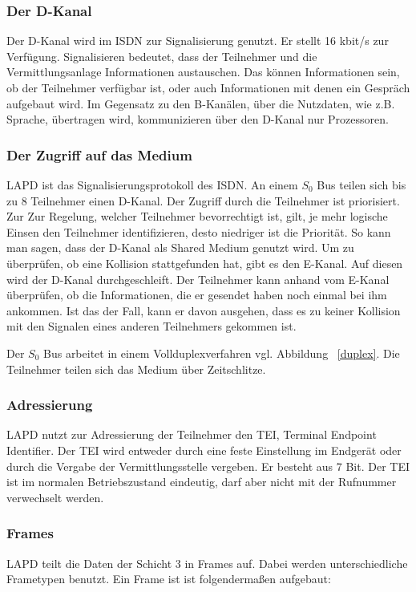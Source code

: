 \documentclass[12pt, a4paper, ngerman]{article}
\begin{document}
\subsubsection{Der D-Kanal}
Der D-Kanal wird im ISDN zur Signalisierung genutzt. Er stellt 16 kbit/s zur Verfügung. Signalisieren bedeutet, dass der Teilnehmer und die Vermittlungsanlage Informationen austauschen. Das können Informationen sein, ob der Teilnehmer verfügbar ist, oder auch Informationen mit denen ein Gespräch aufgebaut wird. Im Gegensatz zu den B-Kanälen, über die Nutzdaten, wie z.B. Sprache, übertragen wird, kommunizieren über den D-Kanal nur Prozessoren.

\subsubsection{Der Zugriff auf das Medium}
LAPD ist das Signalisierungsprotokoll des ISDN. An einem $S_0$ Bus teilen sich bis zu 8 Teilnehmer einen D-Kanal. Der Zugriff durch die Teilnehmer ist priorisiert. Zur Zur Regelung, welcher Teilnehmer bevorrechtigt ist, gilt, je mehr logische Einsen den Teilnehmer identifizieren, desto niedriger ist die Priorität. So kann man sagen, dass der D-Kanal als Shared Medium genutzt wird. Um zu überprüfen, ob eine Kollision stattgefunden hat, gibt es den E-Kanal. Auf diesen wird der D-Kanal durchgeschleift. Der Teilnehmer kann anhand vom E-Kanal überprüfen, ob die Informationen, die er gesendet haben noch einmal bei ihm ankommen. Ist das der Fall, kann er davon ausgehen, dass es zu keiner Kollision mit den Signalen eines anderen Teilnehmers gekommen ist.

Der $S_0$ Bus arbeitet in einem Vollduplexverfahren vgl. Abbildung ~\ref{duplex}. Die Teilnehmer teilen sich das Medium über Zeitschlitze. 

\subsubsection{Adressierung \label{tei}}
LAPD nutzt zur Adressierung der Teilnehmer den TEI, Terminal Endpoint Identifier. Der TEI wird entweder durch eine feste Einstellung im Endgerät oder durch die Vergabe der Vermittlungsstelle vergeben. Er besteht aus 7 Bit. Der TEI ist im normalen Betriebszustand eindeutig, darf aber nicht mit der Rufnummer verwechselt werden.

\subsubsection{Frames}
LAPD teilt die Daten der Schicht 3 in Frames auf. Dabei werden unterschiedliche Frametypen benutzt. Ein Frame ist ist folgendermaßen aufgebaut:
\end{document}
